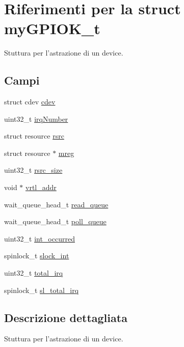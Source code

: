 \hypertarget{structmy_g_p_i_o_k__t}{\section{Riferimenti per la struct my\+G\+P\+I\+O\+K\+\_\+t}
\label{structmy_g_p_i_o_k__t}
}


Stuttura per l'astrazione di un device.  


\subsection*{Campi}
\begin{DoxyCompactItemize}
\item 
struct cdev \hyperlink{structmy_g_p_i_o_k__t_acba682fe45d5a1501790dbdb1d99bd6a}{cdev}
\item 
uint32\+\_\+t \hyperlink{structmy_g_p_i_o_k__t_a42a1593ebe61611c4e29413903a373a5}{irq\+Number}
\item 
struct resource \hyperlink{structmy_g_p_i_o_k__t_a565a1848c3ae8026257a74cf169c6941}{rsrc}
\item 
struct resource $\ast$ \hyperlink{structmy_g_p_i_o_k__t_a18c4eb95350c67ccb239a8a39c43c09a}{mreg}
\item 
uint32\+\_\+t \hyperlink{structmy_g_p_i_o_k__t_a0f87b53dc5049a349ef01aa586c0b5dc}{rsrc\+\_\+size}
\item 
void $\ast$ \hyperlink{structmy_g_p_i_o_k__t_af5aef493b3c2bc9d1f036ce0acea9bba}{vrtl\+\_\+addr}
\item 
wait\+\_\+queue\+\_\+head\+\_\+t \hyperlink{structmy_g_p_i_o_k__t_a251570f8e6976ad87411093e330e7b4f}{read\+\_\+queue}
\item 
wait\+\_\+queue\+\_\+head\+\_\+t \hyperlink{structmy_g_p_i_o_k__t_a2080617f88cafd765430573afe7701d1}{poll\+\_\+queue}
\item 
uint32\+\_\+t \hyperlink{structmy_g_p_i_o_k__t_a6fd94ecf2bef1aa7bd105577b660a112}{int\+\_\+occurred}
\item 
spinlock\+\_\+t \hyperlink{structmy_g_p_i_o_k__t_a1e1ddf972b4dc84dd331a0c72e5d9895}{slock\+\_\+int}
\item 
uint32\+\_\+t \hyperlink{structmy_g_p_i_o_k__t_a2da711ac290a9613b8d8af97f122b997}{total\+\_\+irq}
\item 
spinlock\+\_\+t \hyperlink{structmy_g_p_i_o_k__t_ac41bbc7fe03ef25b7f468275fb565d78}{sl\+\_\+total\+\_\+irq}
\end{DoxyCompactItemize}


\subsection{Descrizione dettagliata}
Stuttura per l'astrazione di un device. 

